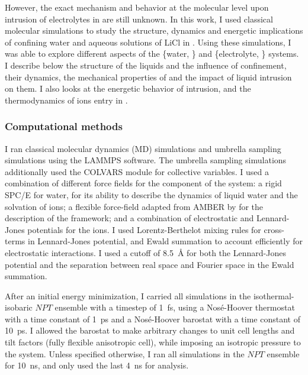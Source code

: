 \documentclass[thesis]{subfiles}
\begin{document}
However, the exact mechanism and behavior at the molecular level upon intrusion
of electrolytes in  are still unknown. In this work, I used classical
molecular simulations to study the structure, dynamics and energetic
implications of confining water and aqueous solutions of LiCl in . Using
these simulations, I was able to explore different aspects of the \{water,
\} and \{electrolyte, \} systems. I describe below the structure of
the liquids and the influence of confinement, their dynamics, the mechanical
properties of  and the impact of liquid intrusion on them. I also looks at
the energetic behavior of intrusion, and the thermodynamics of ions entry in
.

\subsubsection{Computational methods}

I ran classical molecular dynamics (MD) simulations and umbrella sampling
simulations using the LAMMPS\cite{Plimpton1993} software. The umbrella sampling
simulations additionally used the COLVARS\cite{Fiorin2013} module for collective
variables. I used a combination of different force fields for the component of
the system: a rigid SPC/E\cite{Berendsen1987} for water, for its ability to
describe the dynamics of liquid water and the solvation of ions; a flexible
force-field adapted from AMBER by \citeauthor{Zheng2012}\cite{Zheng2012} for the
description of the  framework; and a combination of electrostatic and
Lennard-Jones potentials for the ions\cite{Chowdhuri2003}. I used
Lorentz-Berthelot mixing rules for cross-terms in Lennard-Jones potential, and
Ewald summation to account efficiently for electrostatic interactions. I used a
cutoff of \SI{8.5}{\AA} for both the Lennard-Jones potential and the
separation between real space and Fourier space in the Ewald summation.

After an initial energy minimization, I carried all simulations in the
isothermal-isobaric $NPT$ ensemble with a timestep of \SI{1}{fs}, using a
Nosé-Hoover thermostat with a time constant of \SI{1}{ps} and a Nosé-Hoover
barostat with a time constant of \SI{10}{ps}. I allowed the barostat to make
arbitrary changes to unit cell lengths and tilt factors (fully flexible
anisotropic cell), while imposing an isotropic pressure to the system. Unless
specified otherwise, I ran all simulations in the $NPT$ ensemble for
\SI{10}{ns}, and only used the last \SI{4}{ns} for analysis.
\end{document}
